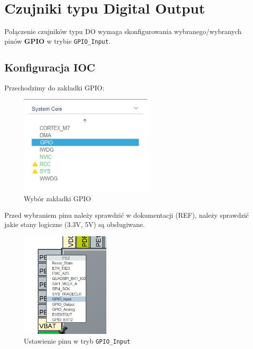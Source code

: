 \documentclass[11pt, a4paper]{article}
\begin{document}
%
%
\mainpagenoimage

\newpage

\section* {Czujniki typu Digital Output}

Połączenie czujników typu DO wymaga skonfigurowania wybranego/wybranych pinów \textbf{GPIO} w trybie
\texttt{GPIO\_Input}.

\subsection*{Konfiguracja IOC}

Przechodzimy do zakładki GPIO:
\begin{figure}[h!]
    \centering
    \includegraphics[width=0.6\textwidth]{IMAGES/gpio.png}
    \caption{Wybór zakładki GPIO}
\end{figure}

Przed wybraniem pinu należy sprawdzić w dokumentacji (REF), należy sprawdzić jakie stany logiczne (3.3V, 5V)
są obsługiwane. 
\begin{figure}[h!]
    \centering
    \includegraphics[width=0.4\textwidth]{IMAGES/input.png}
    \caption{Ustawienie pinu w tryb \texttt{GPIO\_Input}}
\end{figure}
\end{document}
